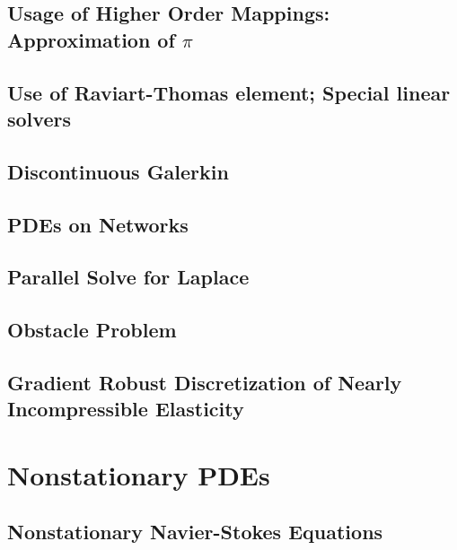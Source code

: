 \documentclass[a4paper,cleardoubleempty]{scrreprt}
\theoremstyle{plain}
\theoremstyle{remark}
\begin{document}
\subsection{Usage of Higher Order Mappings: Approximation of $\pi$}
\label{PDE_higher_order_mapping}

\clearpage
\subsection{Use of Raviart-Thomas element; Special linear solvers}
\label{PDE_RT}

\clearpage
\subsection{Discontinuous Galerkin}
\label{PDE_dG}

\clearpage
\subsection{PDEs on Networks}
\label{PDE_network}

\clearpage
\subsection{Parallel Solve for Laplace}
\label{PDE_parallel}

\clearpage
\subsection{Obstacle Problem}
\label{PDE_obstacle}

\clearpage
\subsection{Gradient Robust Discretization of Nearly Incompressible Elasticity}
\label{PDE_pressurerobust}

\clearpage
\section{Nonstationary PDEs}
\label{PDE_Instat}

\subsection{Nonstationary Navier-Stokes Equations}
\label{PDE_Instat_Stokes}

\clearpage
\end{document}
